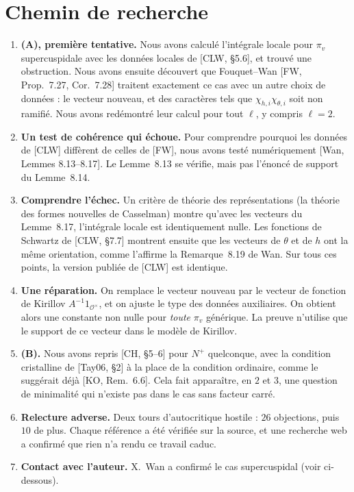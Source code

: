 \documentclass[11pt]{amsart}
\newcommand{\cO}{\mathcal{O}}
\begin{document}
\section{Chemin de recherche}
\begin{enumerate}[label=\arabic*.]
\item \textbf{(A), première tentative.} Nous avons calculé l'intégrale locale pour $\pi_v$ supercuspidale avec les données locales de [CLW, \S5.6], et trouvé une obstruction. Nous avons ensuite découvert que Fouquet--Wan [FW, Prop.~7.27, Cor.~7.28] traitent exactement ce cas avec un autre choix de données : le vecteur nouveau, et des caractères tels que $\chi_{h,i}\chi_{\theta,i}$ soit non ramifié. Nous avons redémontré leur calcul pour tout $\ell$, y compris $\ell=2$.
\item \textbf{Un test de cohérence qui échoue.} Pour comprendre pourquoi les données de [CLW] diffèrent de celles de [FW], nous avons testé numériquement [Wan, Lemmes 8.13--8.17]. Le Lemme~8.13 se vérifie, mais pas l'énoncé de support du Lemme~8.14.
\item \textbf{Comprendre l'échec.} Un critère de théorie des représentations (la théorie des formes nouvelles de Casselman) montre qu'avec les vecteurs du Lemme~8.17, l'intégrale locale est identiquement nulle. Les fonctions de Schwartz de [CLW, \S7.7] montrent ensuite que les vecteurs de $\theta$ et de $h$ ont la même orientation, comme l'affirme la Remarque~8.19 de Wan. Sur tous ces points, la version publiée de [CLW] est identique.
\item \textbf{Une réparation.} On remplace le vecteur nouveau par le vecteur de fonction de Kirillov $A^{-1}1_{\cO^\times}$, et on ajuste le type des données auxiliaires. On obtient alors une constante non nulle pour \emph{toute} $\pi_v$ générique. La preuve n'utilise que le support de ce vecteur dans le modèle de Kirillov.
\item \textbf{(B).} Nous avons repris [CH, \S5--6] pour $N^+$ quelconque, avec la condition cristalline de [Tay06, \S2] à la place de la condition ordinaire, comme le suggérait déjà [KO, Rem.~6.6]. Cela fait apparaître, en $2$ et $3$, une question de minimalité qui n'existe pas dans le cas sans facteur carré.
\item \textbf{Relecture adverse.} Deux tours d'autocritique hostile : $26$ objections, puis $10$ de plus. Chaque référence a été vérifiée sur la source, et une recherche web a confirmé que rien n'a rendu ce travail caduc.
\item \textbf{Contact avec l'auteur.} X.~Wan a confirmé le cas supercuspidal (voir ci-dessous).
\end{enumerate}
\end{document}
